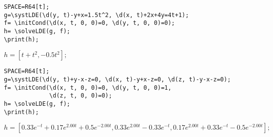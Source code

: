 \begin{verbatim}
SPACE=R64[t];
g=\systLDE(\d(y, t)-y+x=1.5t^2, \d(x, t)+2x+4y=4t+1);
f= \initCond(\d(x, t, 0, 0)=0, \d(y, t, 0, 0)=0);
h= \solveLDE(g, f);  
\print(h);
\end{verbatim}

{$h = [t+t^{2},-0.5t^{2}];$}

\begin{verbatim}
SPACE=R64[t];
g=\systLDE(\d(y, t)+y-x-z=0, \d(x, t)-y+x-z=0, \d(z, t)-y-x-z=0);
f= \initCond(\d(x, t, 0, 0)=0, \d(y, t, 0, 0)=1, 
             \d(z, t, 0, 0)=0);
h= \solveLDE(g, f);  
\print(h);
\end{verbatim}

{$h = [0.33e^{-t}+0.17e^{2.00t}+0.5e^{-2.00t},
0.33e^{2.00t}-0.33e^{-t},
0.17e^{2.00t}+0.33e^{-t}-0.5e^{-2.00t}];$}


